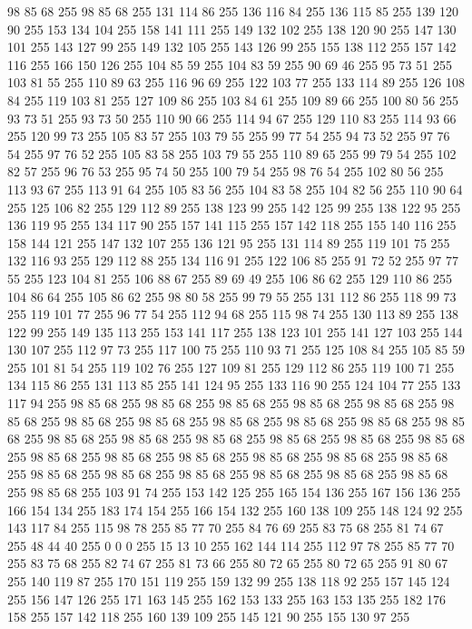 98 85 68 255 98 85 68 255 131 114 86 255 136 116 84 255 136 115 85 255 139 120 90 255 153 134 104 255 158 141 111 255 149 132 102 255 138 120 90 255 147 130 101 255 143 127 99 255 149 132 105 255 143 126 99 255 155 138 112 255 157 142 116 255 166 150 126 255 104 85 59 255 104 83 59 255 90 69 46 255 95 73 51 255 103 81 55 255 110 89 63 255 116 96 69 255 122 103 77 255 133 114 89 255 126 108 84 255 119 103 81 255 127 109 86 255 103 84 61 255 109 89 66 255 100 80 56 255 93 73 51 255 93 73 50 255 110 90 66 255 114 94 67 255 129 110 83 255 114 93 66 255 120 99 73 255 105 83 57 255 103 79 55 255 99 77 54 255 94 73 52 255 97 76 54 255 97 76 52 255 105 83 58 255 103 79 55 255 110 89 65 255 99 79 54 255 102 82 57 255 96 76 53 255 95 74 50 255 100 79 54 255 98 76 54 255 102 80 56 255 113 93 67 255 113 91 64 255 105 83 56 255 104 83 58 255 104 82 56 255 110 90 64 255 125 106 82 255 129 112 89 255 138 123 99 255
142 125 99 255 138 122 95 255 136 119 95 255 134 117 90 255 157 141 115 255 157 142 118 255 155 140 116 255 158 144 121 255 147 132 107 255 136 121 95 255 131 114 89 255 119 101 75 255 132 116 93 255 129 112 88 255 134 116 91 255 122 106 85 255 91 72 52 255 97 77 55 255 123 104 81 255 106 88 67 255 89 69 49 255 106 86 62 255 129 110 86 255 104 86 64 255 105 86 62 255 98 80 58 255 99 79 55 255 131 112 86 255 118 99 73 255 119 101 77 255 96 77 54 255 112 94 68 255 115 98 74 255 130 113 89 255 138 122 99 255 149 135 113 255 153 141 117 255 138 123 101 255 141 127 103 255 144 130 107 255 112 97 73 255 117 100 75 255 110 93 71 255 125 108 84 255 105 85 59 255 101 81 54 255 119 102 76 255 127 109 81 255 129 112 86 255 119 100 71 255 134 115 86 255 131 113 85 255 141 124 95 255 133 116 90 255 124 104 77 255 133 117 94 255 98 85 68 255 98 85 68 255 98 85 68 255 98 85 68 255 98 85 68 255 98 85 68 255 98 85 68 255 98 85 68 255
98 85 68 255 98 85 68 255 98 85 68 255 98 85 68 255 98 85 68 255 98 85 68 255 98 85 68 255 98 85 68 255 98 85 68 255 98 85 68 255 98 85 68 255 98 85 68 255 98 85 68 255 98 85 68 255 98 85 68 255 98 85 68 255 98 85 68 255 98 85 68 255 98 85 68 255 98 85 68 255 98 85 68 255 98 85 68 255 98 85 68 255 103 91 74 255 153 142 125 255 165 154 136 255 167 156 136 255 166 154 134 255 183 174 154 255 166 154 132 255 160 138 109 255 148 124 92 255 143 117 84 255 115 98 78 255 85 77 70 255 84 76 69 255 83 75 68 255 81 74 67 255 48 44 40 255 0 0 0 255 15 13 10 255 162 144 114 255 112 97 78 255 85 77 70 255 83 75 68 255 82 74 67 255 81 73 66 255 80 72 65 255 80 72 65 255 91 80 67 255 140 119 87 255 170 151 119 255 159 132 99 255 138 118 92 255 157 145 124 255 156 147 126 255 171 163 145 255 162 153 133 255 163 153 135 255 182 176 158 255 157 142 118 255 160 139 109 255 145 121 90 255 155 130 97 255
